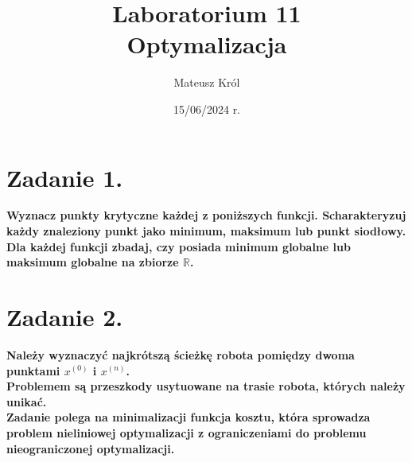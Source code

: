 \documentclass{article}
\title{%
Laboratorium 11\\
  \huge Optymalizacja}
\author{Mateusz Król}
\date{15/06/2024 r.}
\begin{document}
\maketitle

 
\section*{Zadanie 1.}
\textbf{Wyznacz punkty krytyczne każdej z poniższych funkcji.
Scharakteryzuj każdy znaleziony punkt jako minimum, maksimum lub punkt siodłowy.
Dla każdej funkcji zbadaj, czy posiada minimum globalne lub maksimum globalne na zbiorze $\mathbb{R}$.}
\newpage

\section*{Zadanie 2.}
\textbf{Należy wyznaczyć najkrótszą ścieżkę robota pomiędzy dwoma punktami
$x^{(0)}$ i $x^{(n)}$. \\
Problemem są przeszkody usytuowane na trasie robota, których
należy unikać.\\
Zadanie polega na minimalizacji funkcja kosztu, która sprowadza
problem nieliniowej optymalizacji z ograniczeniami do problemu nieograniczonej
optymalizacji.}
\newpage
\end{document}
